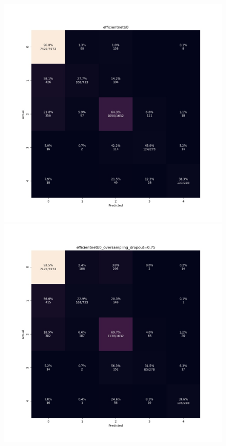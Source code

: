 \documentclass[../main.tex]{subfiles}
\begin{document}
\begin{figure}[htbp]
\centering
\begin{minipage}{5cm}
\centering
\includegraphics[width=1\linewidth]{efficientnetb0.jpeg}
\subcaption{}
\end{minipage}
\begin{minipage}{5cm}
\centering
\includegraphics[width=1\linewidth]{efficientnetb0_oversampling_dropout.jpeg}

\end{minipage}
\end{figure}
\end{document}
